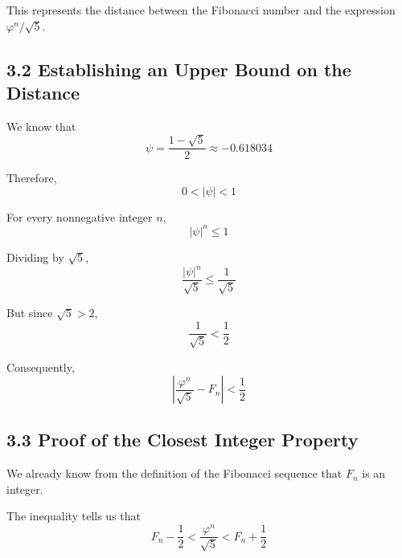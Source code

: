 \documentclass[10pt,letterpaper]{article}
\begin{document}
This represents the distance between the Fibonacci number
and the expression $\varphi^n/\sqrt{5}$.


\subsection*{3.2 Establishing an Upper Bound on the Distance}

We know that
\[
\psi = \dfrac{1 - \sqrt{5}}{2}
\approx -0.618034
\]

Therefore,
\[
0 < |\psi| < 1
\]

For every nonnegative integer $n$,
\[
|\psi|^n \leq 1
\]

Dividing by $\sqrt{5}$,
\[
\dfrac{|\psi|^n}{\sqrt{5}}
\leq \dfrac{1}{\sqrt{5}}
\]

But since $\sqrt{5} > 2$,
\[
\dfrac{1}{\sqrt{5}} < \dfrac{1}{2}
\]

Consequently,
\[
\boxed{
\left|\dfrac{\varphi^n}{\sqrt{5}} - F_n\right|
< \dfrac{1}{2}
}
\]


\subsection*{3.3 Proof of the Closest Integer Property}

We already know from the definition of the Fibonacci
sequence that $F_n$ is an integer.

The inequality tells us that
\[
F_n - \dfrac{1}{2}
<
\dfrac{\varphi^n}{\sqrt{5}}
<
F_n + \dfrac{1}{2}
\]
\end{document}
